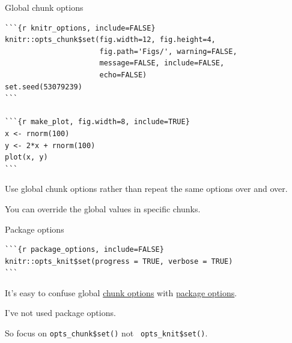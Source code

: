 \documentclass[aspectratio=169,12pt,t]{beamer}
\begin{document}
\begin{frame}[fragile]{Global chunk options}

\vspace{6pt}

\begin{lstlisting}
```{r knitr_options, include=FALSE}
knitr::opts_chunk$set(fig.width=12, fig.height=4,
                      fig.path='Figs/', warning=FALSE,
                      message=FALSE, include=FALSE,
                      echo=FALSE)
set.seed(53079239)
```

```{r make_plot, fig.width=8, include=TRUE}
x <- rnorm(100)
y <- 2*x + rnorm(100)
plot(x, y)
```
\end{lstlisting}

\vfill

\bi
\itemsep12pt
\item Use global chunk options rather than repeat the same options over and over.
\item You can override the global values in specific chunks.
\ei

\end{frame}





\begin{frame}[fragile]{Package options}

\vspace{24pt}

\begin{lstlisting}
```{r package_options, include=FALSE}
knitr::opts_knit$set(progress = TRUE, verbose = TRUE)
```
\end{lstlisting}

\vfill
\bi
\itemsep12pt
\item It's easy to confuse global \href{http://yihui.name/knitr/options#chunk_options}{chunk options} with
\href{http://yihui.name/knitr/options#package_options}{package options}.
\item I've not used package options.
\item So focus on {\tt \hilit opts\_chunk\$set()} not {\tt
  \lolit opts\_knit\$set()}.
\ei

\end{frame}
\end{document}
